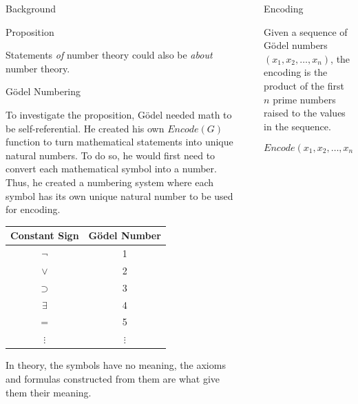 \documentclass[final]{beamer}
\newlength{\sepwidth}
\newlength{\colwidth}
\newcommand{\separatorcolumn}{\begin{column}{\sepwidth}\end{column}}
\begin{document}
\begin{frame}[t]
\begin{columns}[t]
\begin{column}{\colwidth}
\begin{block}{Background}
\end{block}

\begin{exampleblock}{Proposition}

      Statements \textit{of} number theory could also be \textit{about} number theory.

\end{exampleblock}

\begin{block}{Gödel Numbering}

      To investigate the proposition, Gödel needed math to be self-referential. He created his own $Encode(G)$ function to turn mathematical statements into unique natural numbers. To do so, he would first need to convert each mathematical symbol into a number. Thus, he created a numbering system where each symbol has its own unique natural number to be used for encoding.

    \begin{table}[h]
    \centering
    \begin{tabular}{c|c}
    \textbf{Constant Sign} & \textbf{Gödel Number} \\ \hline
    $\neg$ & 1 \\ 
    $\lor$ & 2 \\ 
    $\supset$ & 3 \\ 
    $\exists$ & 4 \\ 
    $=$ & 5 \\ 
    $\vdots$ & $\vdots$ \\ 
    \end{tabular}
    \end{table}

    In theory, the symbols have no meaning, the axioms and formulas constructed from them are what give them their meaning.
    
  \end{block}

\end{column}

\separatorcolumn %

\begin{column}{\colwidth}

  \begin{block}{Encoding}

    Given a sequence of Gödel numbers $(x_1, x_2, \dots, x_n)$, the encoding is the product of the first $n$ prime numbers raised to the values in the sequence.

    $$Encode(x_1, x_2, \dots, x_n) = 2^{x_1} \times 3^{x_2} \times \ldots \times p_n^{x_n}$$


\end{block}
\end{column}
\end{columns}
\end{frame}
\end{document}
